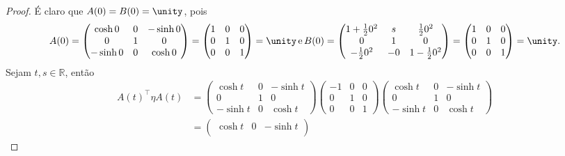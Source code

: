 \begin{proof}
    É claro que \(A(0) = B(0) = \unity\), pois
    \begin{equation*}
        A(0) = \begin{pmatrix}
            \cosh{0} & 0 & -\sinh{0}\\
            0 & 1 & 0\\
            -\sinh{0} & 0 & \cosh{0}
        \end{pmatrix} = \begin{pmatrix}
            1 & 0 & 0\\
            0 & 1 & 0\\
            0 & 0 & 1
        \end{pmatrix} = \unity\,\text{e}\,
        B(0) = \begin{pmatrix}
            1 + \frac12 0^2 & s & \frac120^2\\
            0 & 1 & 0\\
            -\frac120^2 & -0 & 1 - \frac120^2
        \end{pmatrix} = \begin{pmatrix}
            1 & 0 & 0\\
            0 & 1 & 0\\
            0 & 0 & 1
        \end{pmatrix} = \unity.
    \end{equation*}
    Sejam \(t,s \in \mathbb{R}\), então
    \begin{align*}
        A(t)^\intercal \eta A(t) &=
        \begin{pmatrix}
            \cosh{t} & 0 & -\sinh{t}\\
            0 & 1 & 0\\
            -\sinh{t} & 0 & \cosh{t}
        \end{pmatrix}
        \begin{pmatrix}
            -1 & 0 & 0\\
            0 & 1 & 0\\
            0 & 0 & 1
        \end{pmatrix}
        \begin{pmatrix}
            \cosh{t} & 0 & -\sinh{t}\\
            0 & 1 & 0\\
            -\sinh{t} & 0 & \cosh{t}
        \end{pmatrix}\\&=
        \begin{pmatrix}
            \cosh{t} & 0 & -\sinh{t}\\

\end{pmatrix}
\end{align*}
\end{proof}
